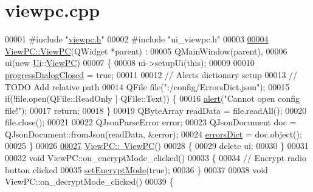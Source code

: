 \hypertarget{viewpc_8cpp_source}{}\section{viewpc.\+cpp}
\label{viewpc_8cpp_source}

\begin{DoxyCode}
00001 \textcolor{preprocessor}{#include "\mbox{\hyperlink{viewpc_8h}{viewpc.h}}"}
00002 \textcolor{preprocessor}{#include "ui\_viewpc.h"}
00003 
\mbox{\hyperlink{class_view_p_c_a33c96c61f61042319c66c19059836b7f}{00004}} \mbox{\hyperlink{class_view_p_c_a33c96c61f61042319c66c19059836b7f}{ViewPC::ViewPC}}(QWidget *parent) :
00005     QMainWindow(parent),
00006     ui(new \mbox{\hyperlink{namespace_ui}{Ui}}::\mbox{\hyperlink{class_view_p_c}{ViewPC}})
00007 \{
00008     ui->setupUi(\textcolor{keyword}{this});
00009 
00010     \mbox{\hyperlink{class_view_p_c_add8c82aa2b0b934212aa5bde9277ab36}{progressDialogClosed}} = \textcolor{keyword}{true};
00011 
00012     \textcolor{comment}{// Alerts dictionary setup}
00013     \textcolor{comment}{// TODO Add relative path}
00014     QFile file(\textcolor{stringliteral}{":/config/ErrorsDict.json"});
00015     \textcolor{keywordflow}{if}(!file.open(QFile::ReadOnly | QFile::Text)) \{
00016         \mbox{\hyperlink{class_view_p_c_a7c467169467789561078abc9d4fe57bd}{alert}}(\textcolor{stringliteral}{"Cannot open config file!"});
00017         \textcolor{keywordflow}{return};
00018     \}
00019     QByteArray readData = file.readAll();
00020     file.close();
00021 
00022     QJsonParseError error;
00023     QJsonDocument doc = QJsonDocument::fromJson(readData, &error);
00024     \mbox{\hyperlink{class_view_p_c_a26f90436aca32e5bad46f5e69a7e7e09}{errorsDict}} = doc.object();
00025 \}
00026 
\mbox{\hyperlink{class_view_p_c_a91c51f5c1e6ed5ab12b410339f469b0f}{00027}} \mbox{\hyperlink{class_view_p_c_a91c51f5c1e6ed5ab12b410339f469b0f}{ViewPC::~ViewPC}}()
00028 \{
00029     \textcolor{keyword}{delete} ui;
00030 \}
00031 
00032 \textcolor{keywordtype}{void} ViewPC::on\_encryptMode\_clicked()
00033 \{
00034     \textcolor{comment}{// Encrypt radio button clicked}
00035     \mbox{\hyperlink{class_view_p_c_a5b48951efefdc0e3039c9a4bf185320b}{setEncryptMode}}(\textcolor{keyword}{true});
00036 \}
00037 
00038 \textcolor{keywordtype}{void} ViewPC::on\_decryptMode\_clicked()
00039 \{

\end{DoxyCode}
